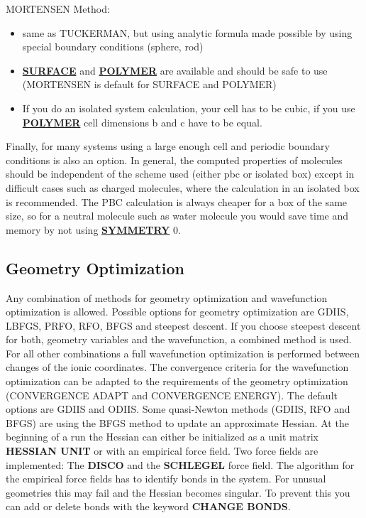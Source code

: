\documentclass[twoside,10pt,titlepage,a4paper]{article}
\newcommand{\referto}[2]{\hyperlink{#1}{#2}}
\newcommand{\referto}[2]{\htmlref{#2}{#1}}
\newcommand{\refkeyword}[1]{%
\referto{#1}{\textbf{#1}}%
\index{#1}%
}%
\begin{document}
MORTENSEN Method:
\begin{itemize}
 \item same as TUCKERMAN, but using analytic formula
    made possible by using special boundary conditions
    (sphere, rod)
 \item \refkeyword{SURFACE} and \refkeyword{POLYMER} are available and
   should be safe to use (MORTENSEN is default for SURFACE and POLYMER)
 \item If you do an isolated system calculation, your cell has
   to be cubic, if you use \refkeyword{POLYMER} cell dimensions b and c
   have to be equal.
\end{itemize}


Finally, for many systems using a large enough cell and
periodic boundary conditions is also an option.
In general, the computed properties of molecules
should be independent of the scheme used (either pbc or isolated
box) except in difficult cases such as charged molecules,
where the calculation in an isolated box is recommended.
The PBC calculation is always cheaper for a box of the same size,
so for a neutral molecule such as water molecule you would
save time and memory by not using \refkeyword{SYMMETRY} 0.


\subsection{Geometry Optimization}

  Any combination of methods for geometry optimization and wavefunction
optimization is allowed. Possible options for geometry optimization are GDIIS,
LBFGS, PRFO, RFO, BFGS and steepest descent. If you choose steepest descent for
both, geometry variables and the wavefunction, a combined method is used. For
all other combinations a full wavefunction optimization is performed between
changes of the ionic coordinates. The convergence criteria for the wavefunction
optimization can be adapted to the requirements of the geometry optimization
(CONVERGENCE ADAPT and CONVERGENCE ENERGY). The default options are GDIIS and
ODIIS. Some quasi-Newton methods (GDIIS, RFO and BFGS) are using the BFGS
method to update an approximate Hessian. At the beginning of a run the Hessian
can either be initialized as a unit matrix {\bf HESSIAN UNIT} or with an
empirical force field. Two force fields are implemented: The {\bf DISCO} and
the {\bf SCHLEGEL} force field. The algorithm for the empirical force fields
has to identify bonds in the system. For unusual geometries this may fail and
the Hessian becomes singular. To prevent this you can add or delete bonds with
the keyword {\bf CHANGE BONDS}.
\end{document}
